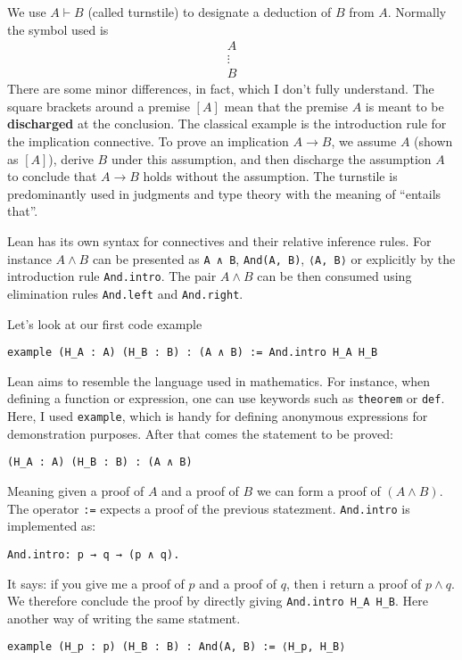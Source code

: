\begin{notation}
We use $A \vdash B$ (called turnstile) to designate a deduction of $B$ from $A$. 
Normally the symbol used is
\[
\begin{array}{c}
A \\
\vdots \\
B
\end{array}
\]
There are some minor differences, in fact, which I don't fully understand.
The square brackets around a premise $[A]$ mean that the premise $A$ is meant to 
be \textbf{discharged} at the conclusion. The classical example is the 
introduction rule for the implication connective.
To prove an implication $A \to B$, we assume $A$ 
(shown as $[A]$), derive $B$ under this assumption, and then discharge the 
assumption $A$ to conclude that $A \to B$ holds without the assumption. 
The turnstile is predominantly used in judgments and type theory with 
the meaning of ``entails that''. 
\end{notation}

Lean has its own syntax for connectives and their relative inference rules.
For instance $A \land B$ can be presented as \lstinline[language=lean]|A ∧ B|,
\lstinline[language=lean]|And(A, B)|, \lstinline[language=lean]|⟨A, B⟩| or explicitly by the introduction rule
 \lstinline[language=lean]|And.intro|. The pair $A \land B$ can be then consumed using elimination 
rules \lstinline[language=lean]|And.left| and \lstinline[language=lean]|And.right|.
\begin{example}
    Let's look at our first code example
  \begin{lstlisting}[language=lean]
    example (H_A : A) (H_B : B) : (A ∧ B) := And.intro H_A H_B
  \end{lstlisting}
Lean aims to resemble the language used in mathematics. 
For instance, when defining a function or expression, one can use keywords such as 
\lstinline[language=lean]|theorem| or \lstinline[language=lean]|def|.
Here, I used \lstinline[language=lean]|example|, which is handy for defining anonymous expressions 
for demonstration purposes. 
After that comes the statement to be proved:
\begin{lstlisting}[language=lean]
  (H_A : A) (H_B : B) : (A ∧ B) 
\end{lstlisting}
Meaning given a proof of $A$ and a proof of $B$ we can form a proof of $(A \land B)$.
The operator \lstinline[language=lean]|:=| expects a proof of the previous statezment.
\lstinline[language=lean]|And.intro| is implemented as:
\begin{lstlisting}[language=lean]
  And.intro: p → q → (p ∧ q).
\end{lstlisting}
It says: if you give me a proof of $p$ and a proof of $q$, 
then i return a proof of $p \land q$.
We therefore conclude the proof by directly giving 
\lstinline[language=lean]|And.intro H_A H_B|.
Here another way of writing the same statment.
\begin{lstlisting}[language=lean]
  example (H_p : p) (H_B : B) : And(A, B) := ⟨H_p, H_B⟩
\end{lstlisting}
\end{example}

